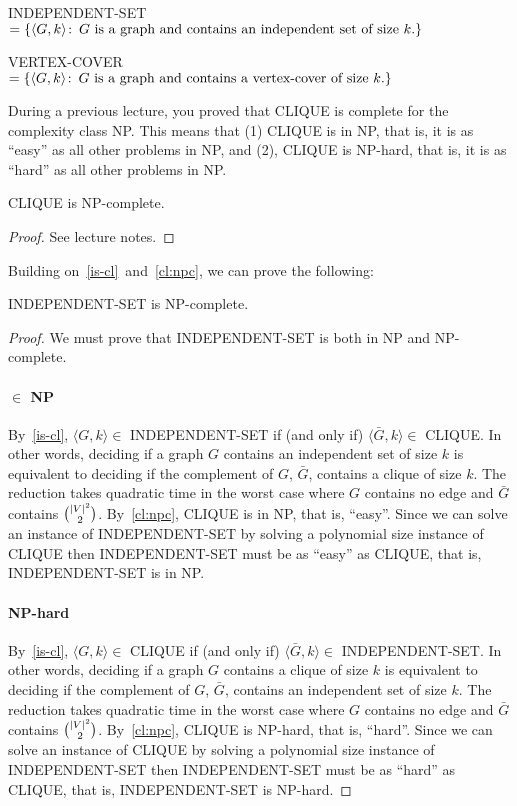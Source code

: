 \begin{definition}
  INDEPENDENT-SET $= \{\langle G,k \rangle \colon\, \text{$G$ is a graph and contains an independent set of size $k$.} \}$
\end{definition}

\begin{definition}
  VERTEX-COVER $= \{\langle G,k \rangle \colon\, \text{$G$ is a graph and contains a vertex-cover of size $k$.} \}$
\end{definition}

During a previous lecture, you proved that CLIQUE is complete for the
complexity class NP. This means that (1) CLIQUE is in NP, that is, it is as
``easy'' as all other problems in NP, and (2), CLIQUE is NP-hard,
that is, it is as ``hard'' as all other problems in NP.
\begin{theorem}\label{cl:npc}
CLIQUE is NP-complete.
\end{theorem}
\begin{proof}
  See lecture notes.
\end{proof}

Building on~\ref{is-cl}~and~\ref{cl:npc}, we can prove the following:
\begin{theorem}\label{is:npc}
INDEPENDENT-SET is NP-complete.
\end{theorem}

\begin{proof}
  We must prove that INDEPENDENT-SET is both in NP and NP-complete.
  \paragraph{$\in$ NP}
  By~\ref{is-cl}, $\langle G,k \rangle \in$ INDEPENDENT-SET if (and only if)
  $\langle \bar{G},k\rangle \in$ CLIQUE.
  In other words, deciding if a graph $G$ contains an independent set of size $k$ is
  equivalent to deciding if the complement of $G$, $\bar{G}$, contains a
  clique of size $k$. The reduction takes quadratic time in the worst
  case where $G$ contains no edge and $\bar{G}$ contains $\binom{|V|^2}{2}$.
  By~\ref{cl:npc}, CLIQUE is in NP, that is, ``easy''. Since
  we can solve an instance of INDEPENDENT-SET by solving a polynomial size instance of
  CLIQUE then INDEPENDENT-SET must be as ``easy'' as CLIQUE, that
  is, INDEPENDENT-SET is in NP.

  \paragraph{NP-hard}
  By~\ref{is-cl}, $\langle G,k \rangle \in$ CLIQUE if (and only if)
  $\langle \bar{G},k\rangle \in$ INDEPENDENT-SET.
  In other words, deciding if a graph $G$ contains a clique of size $k$ is
  equivalent to deciding if the complement of $G$, $\bar{G}$, contains an
  independent set of size $k$. The reduction takes quadratic time in the worst
  case where $G$ contains no edge and $\bar{G}$ contains $\binom{|V|^2}{2}$.
  By~\ref{cl:npc}, CLIQUE is NP-hard, that is, ``hard''. Since
  we can solve an instance of CLIQUE by solving a polynomial size instance of
  INDEPENDENT-SET then INDEPENDENT-SET must be as ``hard'' as CLIQUE, that
  is, INDEPENDENT-SET is NP-hard.
\end{proof}

